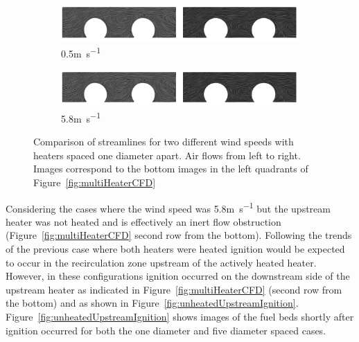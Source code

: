         \begin{figure}
            \centering
             \begin{subfigure}[b]{0.49\textwidth}
                \centering
                \includegraphics[width=\textwidth, trim={27cm 0 0 0},clip]{Figures/recirculationComparison.png}
                \caption{0.5\si{\meter\per\second}}
                \label{subfig:comparisonLowWind}
            \end{subfigure}
            \begin{subfigure}[b]{0.49\textwidth}
                \centering
                \includegraphics[width=\textwidth, trim={0 0 27cm 0},clip]{Figures/recirculationComparison.png}
                \caption{5.8\si{\meter\per\second}}
                \label{subfig:comparisonHighWind}
            \end{subfigure}
            \caption{Comparison of streamlines for two different wind speeds with heaters spaced one diameter apart. Air flows from left to right. Images correspond to the bottom images in the left quadrants of Figure~\ref{fig:multiHeaterCFD}}
            \label{fig:streamlineComparison}
        \end{figure}
    Considering the cases where the wind speed was 5.8\si{\meter\per\second} but the upstream heater was not heated and is effectively an inert flow obstruction (Figure~\ref{fig:multiHeaterCFD} second row from the bottom). Following the trends of the previous case where both heaters were heated ignition would be expected to occur in the recirculation zone upstream of the actively heated heater. However, in these configurations ignition occurred on the downstream side of the upstream heater as indicated in Figure~\ref{fig:multiHeaterCFD} (second row from the bottom) and as shown in Figure~\ref{fig:unheatedUpstreamIgnition}. Figure~\ref{fig:unheatedUpstreamIgnition} shows images of the fuel beds shortly after ignition occurred for both the one diameter and five diameter spaced cases. 
